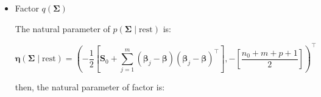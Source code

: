 \begin{appendix}
\begin{itemize}
\begin{equation}
\bm{\eta}(\bm{\beta}\mid \text{rest})=\left(\left[ \bm{\Lambda}_0^{-1} \bm{\mu}_0 + \bm{\Sigma}^{-1} \sum_{j=1}^{m} \bm{\beta}_j \right],-\frac{1}{2}\left( \bm{\Lambda}_0^{-1} + \sum_{j=1}^{m}\bm{\Sigma}^{-1} \right)\right)^\top
\end{equation}

then, the natural parameter of factor is:

\begin{equation}
\mathsf{E}_{-\bm{\beta}}\left[\bm{\eta}(\bm{\beta}\mid \text{rest})\right]=\left( \bm{\Lambda}_0^{-1} \bm{\mu}_0 + \sum_{j=1}^{m}\mathsf{E}_{\bm{\Sigma}}\left[\bm{\Sigma}^{-1}\right] \mathsf{E}_{\bm{\beta}_j}\left[\bm{\beta}_j \right],-\frac{1}{2}\left[\bm{\Lambda}_0^{-1}   + \sum_{j=1}^{m}\mathsf{E}_{\bm{\Sigma}}\left[\bm{\Sigma}^{-1}\right]  \right]\right)^\top
\end{equation}

therefore using the inverse mapping from natural to canonical parameters, we have $q(\bm{\beta})=\mathsf{N_p}(\bm{\mu}_{\bm{\beta}},\bm{\Sigma}_{\bm{\beta}})$, where:

\begin{equation}
\bm{\Sigma}_{\bm{\beta}} = \left[\bm{\Lambda}_0^{-1}   + \sum_{j=1}^{m}\mathsf{E}_{\bm{\Sigma}}\left[\bm{\Sigma}^{-1}\right]  \right] ^{-1}
\end{equation}

and

\begin{equation}
\bm{\mu}_{\bm{\beta}}= \left[\bm{\Lambda}_0^{-1}   + \sum_{j=1}^{m}\mathsf{E}_{\bm{\Sigma}}\left[\bm{\Sigma}^{-1}\right]  \right]^{-1}\left[\bm{\Lambda}_0^{-1} \bm{\mu}_0 +\sum_{j=1}^{m}\mathsf{E}_{\bm{\Sigma}}\left[\bm{\Sigma}^{-1}\right] \mathsf{E}_{\bm{\beta}_j}\left[\bm{\beta}_j \right]\right]
\end{equation}

\item Factor $q(\bm{\Sigma})$

The natural parameter of $p(\bm{\Sigma}\mid \text{rest}) $ is:

\begin{equation}
\bm{\eta}(\bm{\Sigma}\mid \text{rest})=\left(-\frac{1}{2}\left[ \bm{S}_0 + \sum_{j=1}^{m} (\bm{\beta}_j - \bm{\beta})(\bm{\beta}_j - \bm{\beta})^\top\right],-\left[\frac{n_0 + m + p + 1}{2}\right]\right)^\top
\end{equation}

then, the natural parameter of factor is:


\end{itemize}
\end{appendix}
